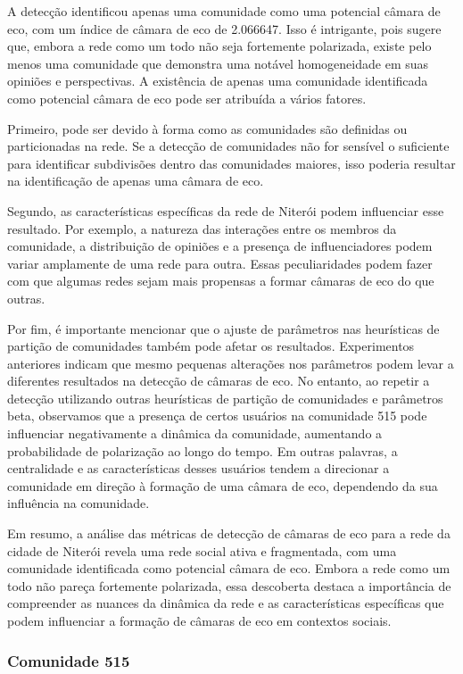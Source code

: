 A detecção identificou apenas uma comunidade como uma potencial câmara de eco, com um índice de câmara de eco de 2.066647. Isso é intrigante, pois sugere que, embora a rede como um todo não seja fortemente polarizada, existe pelo menos uma comunidade que demonstra uma notável homogeneidade em suas opiniões e perspectivas. A existência de apenas uma comunidade identificada como potencial câmara de eco pode ser atribuída a vários fatores.

Primeiro, pode ser devido à forma como as comunidades são definidas ou particionadas na rede. Se a detecção de comunidades não for sensível o suficiente para identificar subdivisões dentro das comunidades maiores, isso poderia resultar na identificação de apenas uma câmara de eco.

Segundo, as características específicas da rede de Niterói podem influenciar esse resultado. Por exemplo, a natureza das interações entre os membros da comunidade, a distribuição de opiniões e a presença de influenciadores podem variar amplamente de uma rede para outra. Essas peculiaridades podem fazer com que algumas redes sejam mais propensas a formar câmaras de eco do que outras.

Por fim, é importante mencionar que o ajuste de parâmetros nas heurísticas de partição de comunidades também pode afetar os resultados. Experimentos anteriores indicam que mesmo pequenas alterações nos parâmetros podem levar a diferentes resultados na detecção de câmaras de eco. No entanto, ao repetir a detecção utilizando outras heurísticas de partição de comunidades e parâmetros beta, observamos que a presença de certos usuários na comunidade 515 pode influenciar negativamente a dinâmica da comunidade, aumentando a probabilidade de polarização ao longo do tempo. Em outras palavras, a centralidade e as características desses usuários tendem a direcionar a comunidade em direção à formação de uma câmara de eco, dependendo da sua influência na comunidade.

Em resumo, a análise das métricas de detecção de câmaras de eco para a rede da cidade de Niterói revela uma rede social ativa e fragmentada, com uma comunidade identificada como potencial câmara de eco. Embora a rede como um todo não pareça fortemente polarizada, essa descoberta destaca a importância de compreender as nuances da dinâmica da rede e as características específicas que podem influenciar a formação de câmaras de eco em contextos sociais.

\subsubsection*{Comunidade 515}

